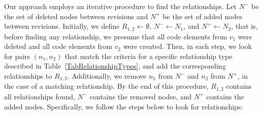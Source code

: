 Our approach employs an iterative procedure to find the relationships.
Let $N^-$ be the set of deleted nodes between revisions and $N^+$ be the set of added nodes between revisions.
Initially, we define $R_{1,2} \gets \emptyset$, $N^- \gets N_1$, and $N^+ \gets N_2$, that is, before finding any relationship, we presume that all code elements from $v_1$ were deleted and  all code elements from $v_2$ were created.
Then, in each step, we look for pairs $(n_1, n_2)$ that match the criteria for a specific relationship type described in Table~\ref{TabRelationshipTypes}, and add the corresponding relationships to $R_{1,2}$.
Additionally, we remove $n_1$ from $N^-$ and $n_2$ from $N^+$, in the case of a matching relationship.
By the end of this procedure, $R_{1,2}$ contains all relationships found, $N^-$ contains the removed nodes, and $N^+$ contains the added nodes.
Specifically, we follow the steps below to look for relationships:
